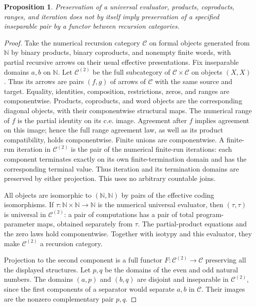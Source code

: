 \documentclass[11pt]{article}
\newtheorem{proposition}[theorem]{Proposition}
\begin{document}
\begin{proposition}\label{prop:projection}
Preservation of a universal evaluator, products, coproducts, ranges,
and iteration does not by itself imply preservation of a specified
inseparable pair by a functor between recursion categories.
\end{proposition}
\begin{proof}
Take the numerical recursion category $\mathscr C$ on formal objects
generated from $\mathbb N$ by binary products, binary coproducts, and
nonempty finite words, with partial recursive arrows on their usual
effective presentations. Fix inseparable domains $a,b$ on $\mathbb N$.
Let $\mathscr C^{(2)}$ be the full subcategory of
$\mathscr C\times\mathscr C$ on objects $(X,X)$.
Thus its arrows are pairs $(f,g)$ of arrows of $\mathscr C$ with
the same source and target. Equality, identities, composition,
restrictions, zeros, and ranges are componentwise. Products,
coproducts, and word objects are the corresponding diagonal objects,
with their componentwise structural maps. The numerical range of $f$
is the partial identity on its c.e. image. Agreement after $f$ implies
agreement on this image; hence the full range agreement law, as well
as its product compatibility, holds componentwise.
Finite unions are componentwise. A finite-run iteration in
$\mathscr C^{(2)}$ is the pair of the numerical finite-run iterations:
each component terminates exactly on its own finite-termination domain
and has the corresponding terminal value. Thus iteration and its
termination domains are preserved by either projection. This uses no
arbitrary countable joins.

All objects are isomorphic to $(\mathbb N,\mathbb N)$ by pairs of
the effective coding isomorphisms. If
$\tau:\mathbb N\times\mathbb N\to\mathbb N$ is the numerical
universal evaluator, then $(\tau,\tau)$ is universal in
$\mathscr C^{(2)}$: a pair of computations has a pair of total
program-parameter maps, obtained separately from $\tau$.
The partial-product equations and the zero laws hold componentwise.
Together with isotypy and this evaluator, they make
$\mathscr C^{(2)}$ a recursion category.

Projection to the second component is a full functor
$F:\mathscr C^{(2)}\to\mathscr C$ preserving all the displayed
structures. Let $p,q$ be the domains of the even and odd natural
numbers. The domains $(a,p)$ and $(b,q)$ are disjoint and inseparable in
$\mathscr C^{(2)}$, since the first components of a separator
would separate $a,b$ in $\mathscr C$.
Their images are the nonzero complementary pair $p,q$.
\end{proof}
\end{document}
